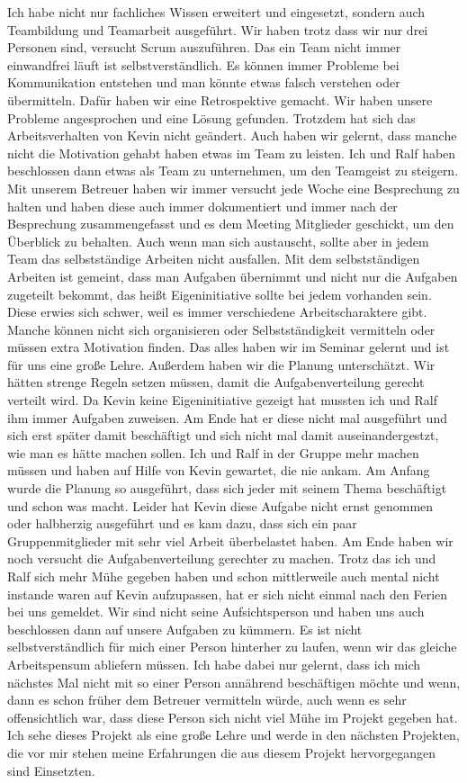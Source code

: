 \noindent Ich habe nicht nur fachliches Wissen erweitert und eingesetzt, sondern auch Teambildung und Teamarbeit ausgeführt. Wir haben trotz dass wir nur drei Personen sind, versucht Scrum auszuführen.
Das ein Team nicht immer einwandfrei läuft ist selbstverständlich. 
Es können immer Probleme bei Kommunikation entstehen und man könnte etwas falsch verstehen oder übermitteln. 
Dafür haben wir eine Retrospektive gemacht. Wir haben unsere Probleme angesprochen und eine Lösung gefunden. Trotzdem hat sich das Arbeitsverhalten von Kevin nicht geändert.
Auch haben wir gelernt, dass manche nicht die Motivation gehabt haben etwas im Team zu leisten. Ich und Ralf haben beschlossen dann etwas als Team zu unternehmen, um den Teamgeist zu steigern. 
Mit unserem Betreuer haben wir immer versucht jede Woche eine Besprechung zu halten und haben diese auch immer dokumentiert und immer nach der Besprechung zusammengefasst und es dem Meeting Mitglieder geschickt, um den Überblick zu behalten. 
Auch wenn man sich austauscht, sollte aber in jedem Team das selbstständige Arbeiten nicht ausfallen. Mit dem selbstständigen Arbeiten ist gemeint, 
dass man Aufgaben übernimmt und nicht nur die Aufgaben zugeteilt bekommt, das heißt Eigeninitiative sollte bei jedem vorhanden sein. Diese erwies sich schwer, weil es immer verschiedene Arbeitscharaktere gibt. 
Manche können nicht sich organisieren oder Selbstständigkeit vermitteln oder müssen extra Motivation finden. Das alles haben wir im Seminar gelernt und ist für uns eine große Lehre.\newline
Außerdem haben wir die Planung unterschätzt. Wir hätten strenge Regeln setzen müssen, damit die Aufgabenverteilung gerecht verteilt wird. Da Kevin keine Eigeninitiative gezeigt hat mussten ich und Ralf
ihm immer Aufgaben zuweisen. Am Ende hat er diese nicht mal ausgeführt und sich erst später damit beschäftigt und sich nicht mal damit auseinandergestzt, wie man es hätte machen sollen.
Ich und Ralf in der Gruppe mehr machen müssen und haben auf Hilfe von Kevin gewartet, die nie ankam. Am Anfang wurde die Planung so ausgeführt, dass sich jeder mit seinem Thema beschäftigt und schon was macht. 
Leider hat Kevin diese Aufgabe nicht ernst genommen oder halbherzig ausgeführt und es kam dazu, dass sich ein paar Gruppenmitglieder mit sehr viel Arbeit überbelastet haben. Am Ende haben wir noch versucht die Aufgabenverteilung gerechter zu machen. 
Trotz das ich und Ralf sich mehr Mühe gegeben haben und schon mittlerweile auch mental nicht instande waren auf Kevin aufzupassen, hat er sich nicht einmal nach den Ferien bei uns gemeldet.
Wir sind nicht seine Aufsichtsperson und haben uns auch beschlossen dann auf unsere Aufgaben zu kümmern. Es ist nicht selbstverständlich für mich einer Person hinterher zu laufen,
wenn wir das gleiche Arbeitspensum abliefern müssen. Ich habe dabei nur gelernt, dass ich mich nächstes Mal nicht mit so einer Person annährend beschäftigen möchte und wenn, dann es schon früher
dem Betreuer vermitteln würde, auch wenn es sehr offensichtlich war, dass diese Person sich nicht viel Mühe im Projekt gegeben hat. 
Ich sehe dieses Projekt als eine große Lehre und werde in den nächsten Projekten, die vor mir stehen meine Erfahrungen die aus diesem Projekt hervorgegangen sind Einsetzten.
